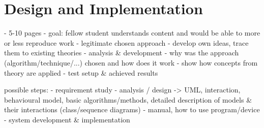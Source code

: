\chapter{Design and Implementation} %

- 5-10 pages
- goal: fellow student understands content and would be able to more or less reproduce work
- legitimate chosen approach
- develop own ideas, trace them to existing theories
- analysis & development
- why was the approach (algorithm/technique/...) chosen and how does it work
- show how concepts from theory are applied
- test setup & achieved results

possible steps:
- requirement study
- analysis / design -> UML, interaction, behavioural model, basic algorithms/methods, detailed description of models & their interactions (class/sequence diagrams)
- manual, how to use program/device
- system development & implementation
